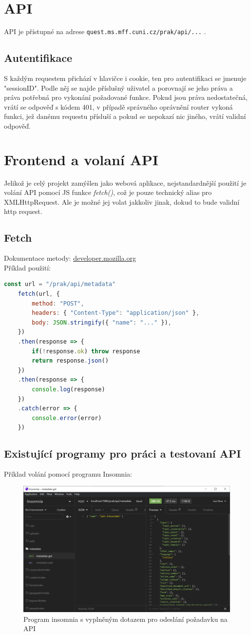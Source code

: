 \section{API}
API je přístupné na adrese \texttt{quest.ms.mff.cuni.cz/prak/api/...} .

\subsection{Autentifikace}
S každým requestem přichází v hlavičce i cookie, ten pro
autentifikaci se jmenuje "sessionID".
Podle něj se najde příslušný uživatel a porovnají se jeho práva a
práva potřebná pro vykonání požadované funkce. Pokud jsou práva nedostatečná,
vrátí se odpověď s kódem 401, v případě správného oprávnění router vykoná funkci,
jež danému requestu přísluší a pokud se nepokazí nic jiného, vrátí validní odpověď.

\section{Frontend a volaní API}
Jelikož je celý projekt zamýšlen jako webová aplikace, nejstandardnější použití
je volání API pomocí JS funkce \textit{fetch()}, což je pouze technický alias pro XMLHttpRequest.
Ale je možné jej volat jakkoliv jinak, dokud to bude validní http request.

\subsection{Fetch}
Dokumentace metody: \href{https://developer.mozilla.org/en-US/docs/Web/API/Fetch_API}{developer.mozilla.org}
\\
Příklad použití:
\\
\begin{lstlisting}[language=JavaScript]
	const url = "/prak/api/metadata" 
	fetch(url, {
		method: "POST",
		headers: { "Content-Type": "application/json" },
		body: JSON.stringify({ "name": "..." }),
	})
	.then(response => {
		if(!response.ok) throw response
		return response.json()
	})
	.then(response => {
		console.log(response)
	})
	.catch(error => {
		console.error(error)
	})
\end{lstlisting}

\subsection{Existující programy pro práci a testovaní API}
Příklad volání pomocí programu Insomnia:
\begin{figure}[H]
	\centering
	\includegraphics[width=\linewidth]{img/InsomniaExample.PNG}
	\caption{Program insomnia s vyplněným dotazem pro odeslání požadavku na API}
\end{figure}
